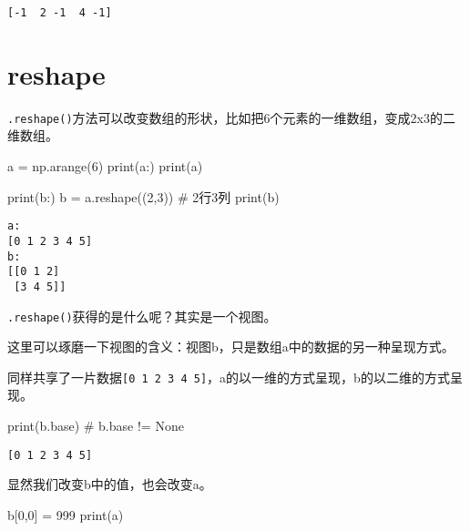 \documentclass[
  letterpaper,
  DIV=11,
  numbers=noendperiod]{scrreprt}
\newenvironment{Shaded}{\begin{snugshade}}{\end{snugshade}}
\newcommand{\BuiltInTok}[1]{\textcolor[rgb]{0.00,0.23,0.31}{#1}}
\newcommand{\CommentTok}[1]{\textcolor[rgb]{0.37,0.37,0.37}{#1}}
\newcommand{\DecValTok}[1]{\textcolor[rgb]{0.68,0.00,0.00}{#1}}
\newcommand{\NormalTok}[1]{\textcolor[rgb]{0.00,0.23,0.31}{#1}}
\newcommand{\OperatorTok}[1]{\textcolor[rgb]{0.37,0.37,0.37}{#1}}
\newcommand{\StringTok}[1]{\textcolor[rgb]{0.13,0.47,0.30}{#1}}
\begin{document}
\begin{verbatim}
[-1  2 -1  4 -1]
\end{verbatim}

\hypertarget{reshape}{%
\section{reshape}\label{reshape}}

\texttt{.reshape()}方法可以改变数组的形状，比如把6个元素的一维数组，变成2x3的二维数组。

\begin{Shaded}
\begin{Highlighting}[]
\NormalTok{a }\OperatorTok{=}\NormalTok{ np.arange(}\DecValTok{6}\NormalTok{)}
\BuiltInTok{print}\NormalTok{(}\StringTok{\textquotesingle{}a:\textquotesingle{}}\NormalTok{)}
\BuiltInTok{print}\NormalTok{(a)}

\BuiltInTok{print}\NormalTok{(}\StringTok{\textquotesingle{}b:\textquotesingle{}}\NormalTok{)}
\NormalTok{b }\OperatorTok{=}\NormalTok{ a.reshape((}\DecValTok{2}\NormalTok{,}\DecValTok{3}\NormalTok{)) }\CommentTok{\# 2行3列}
\BuiltInTok{print}\NormalTok{(b)}
\end{Highlighting}
\end{Shaded}

\begin{verbatim}
a:
[0 1 2 3 4 5]
b:
[[0 1 2]
 [3 4 5]]
\end{verbatim}

\texttt{.reshape()}获得的是什么呢？其实是一个视图。

这里可以琢磨一下视图的含义：视图b，只是数组a中的数据的另一种呈现方式。

同样共享了一片数据\texttt{{[}0\ 1\ 2\ 3\ 4\ 5{]}}，a的以一维的方式呈现，b的以二维的方式呈现。

\begin{Shaded}
\begin{Highlighting}[]
\BuiltInTok{print}\NormalTok{(b.base) }\CommentTok{\# b.base != None}
\end{Highlighting}
\end{Shaded}

\begin{verbatim}
[0 1 2 3 4 5]
\end{verbatim}

显然我们改变b中的值，也会改变a。

\begin{Shaded}
\begin{Highlighting}[]
\NormalTok{b[}\DecValTok{0}\NormalTok{,}\DecValTok{0}\NormalTok{] }\OperatorTok{=} \DecValTok{999}
\BuiltInTok{print}\NormalTok{(a)}
\end{Highlighting}
\end{Shaded}
\end{document}
